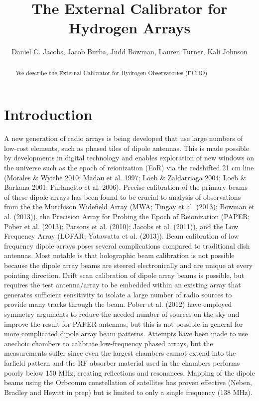 \documentclass[preprint2,numberedappendix,tighten,twocolappendix]{aastex6}
\begin{document}
\title{The External Calibrator for Hydrogen Arrays}



\author{
Daniel C. Jacobs,
Jacob Burba,
Judd Bowman,
Lauren Turner,
Kali Johnson
}




\begin{abstract}
We describe the External Calibrator for Hydrogen Observatories (ECHO)
\end{abstract}




\section{Introduction}\label{sec:intro}

A new generation of radio arrays is being developed that use large numbers of low-cost elements, such as phased tiles of dipole antennas. This is made possible by developments in digital technology and enables exploration of new windows on the universe such as the epoch of reionization (EoR) via the redshifted 21 cm line (Morales \& Wyithe 2010; Madau et al. 1997; Loeb \& Zaldarriaga 2004; Loeb \& Barkana 2001; Furlanetto et al. 2006). Precise calibration of the primary beams of these dipole arrays has been found to be crucial to analysis of observations from the the Murchison Widefield Array (MWA; Tingay et al. (2013); Bowman et al. (2013)), the Precision Array for Probing the Epoch of Reionization (PAPER; Pober et al. (2013); Parsons et al. (2010); Jacobs et al. (2011)), and the Low Frequency Array (LOFAR; Yatawatta et al. (2013)). Beam calibration of low frequency dipole arrays poses several complications compared to traditional dish antennas. Most notable is that holographic beam calibration is not possible because the dipole array beams are steered electronically and are unique at every pointing direction. Drift scan calibration of dipole array beams is possible, but requires the test antenna/array to be embedded within an existing array that generates sufficient sensitivity to isolate a large number of radio sources to provide many tracks through the beam. Pober et al. (2012) have employed symmetry arguments to reduce the needed number of sources on the sky and improve the result for PAPER antennas, but this is not possible in general for more complicated dipole array beam patterns. Attempts have been made to use anechoic chambers to calibrate low-frequency phased arrays, but the measurements suffer since even the largest chambers cannot extend into the farfield pattern and the RF absorber material used in the chambers performs poorly below 150 MHz, creating reflections and resonances. Mapping of the dipole beams using the Orbcomm constellation of satellites has proven effective (Neben, Bradley and Hewitt in prep) but is limited to only a single frequency (138 MHz).
\end{document}
